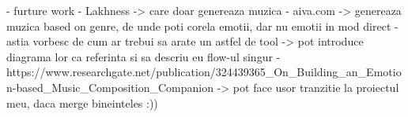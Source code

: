 - furture work
- Lakhness -> care doar genereaza muzica
- aiva.com -> genereaza muzica based on genre, de unde poti corela emotii, dar nu emotii in mod direct
- astia vorbesc de cum ar trebui sa arate un astfel de tool
-> pot introduce diagrama lor ca referinta si sa descriu eu flow-ul singur
- https://www.researchgate.net/publication/324439365_On_Building_an_Emotion-based_Music_Composition_Companion
-> pot face usor tranzitie la proiectul meu, daca merge bineinteles :))
